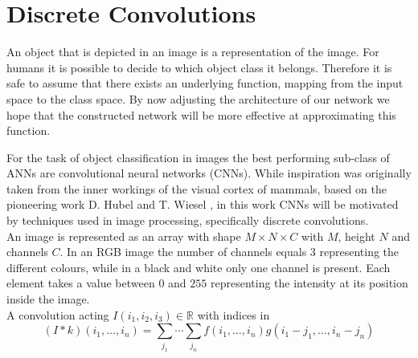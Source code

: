 \section{Discrete Convolutions}\label{sec:DiscreteConvolutions}
An object that is depicted in an image is a representation of the image. For humans it is possible to decide to which object class it belongs. Therefore it is safe to assume that there exists an underlying function, mapping from the input space to the class space. By now adjusting the architecture of our network we hope that the constructed network will be more effective at approximating this function. 

For the task of object classification in images the best performing sub-class of ANNs are convolutional neural networks (CNNs). While inspiration was originally taken from the inner workings of the visual cortex of mammals, based on the pioneering work D. Hubel and T. Wiesel \cite{Hubel}, in this work CNNs will be motivated by techniques used in image processing, specifically discrete convolutions. \\
An image is represented as an array with shape $M\times N\times C$ with $M$, height $N$ and channels $C$. In an RGB image the number of channels equals $3$ representing the different colours, while in a black and white only one channel is present. Each element takes a value between $0$ and $255$ representing the intensity at its position inside the image. \\
A convolution acting $I(i_1,i_2,i_3) \in \mathbb{R}$ with indices in 
\begin{equation}\label{eq:convolutionDiscrete}
(I*k)(i_1,\dots ,i_n) = \sum_{j_1} \cdots \sum_{j_n} f(i_1,\dots ,i_n) g(i_1-j_1,\dots ,i_n-j_n)
\end{equation}
